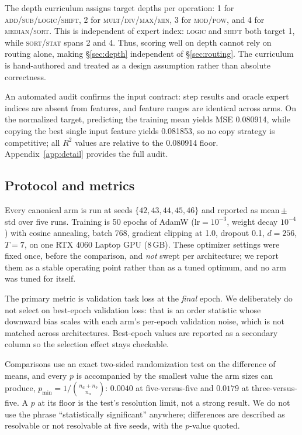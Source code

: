 \documentclass{article}
\begin{document}
The depth curriculum assigns target depths per operation: 1 for \textsc{add}/\textsc{sub}/\textsc{logic}/\textsc{shift}, 2 for \textsc{mult}/\textsc{div}/\textsc{max}/\textsc{min}, 3 for \textsc{mod}/\textsc{pow}, and 4 for \textsc{median}/\textsc{sort}. This is independent of expert index: \textsc{logic} and \textsc{shift} both target 1, while \textsc{sort/stat} spans 2 and 4. Thus, scoring well on depth cannot rely on routing alone, making \S\ref{sec:depth} independent of \S\ref{sec:routing}. The curriculum is hand-authored and treated as a design assumption rather than absolute correctness.

An automated audit confirms the input contract: step results and oracle expert indices are absent from features, and feature ranges are identical across arms. On the normalized target, predicting the training mean yields MSE 0.080914, while copying the best single input feature yields 0.081853, so no copy strategy is competitive; all $R^2$ values are relative to the 0.080914 floor. Appendix~\ref{app:detail} provides the full audit.

\subsection{Protocol and metrics}\label{sec:protocol}
\label{sec:protocol}

Every canonical arm is run at seeds $\{42,43,44,45,46\}$ and reported as
mean\,$\pm$\,std over five runs. Training is 50 epochs of AdamW
($\text{lr}=10^{-3}$, weight decay $10^{-4}$) with cosine annealing, batch
768, gradient clipping at 1.0, dropout 0.1, $d = 256$, $T = 7$, on one RTX
4060 Laptop GPU (8\,GB). These optimizer settings were fixed once, before the
comparison, and \emph{not} swept per architecture; we report them as a stable
operating point rather than as a tuned optimum, and no arm was tuned for
itself.

The primary metric is validation task loss at the \emph{final} epoch. We
deliberately do not select on best-epoch validation loss: that is an order
statistic whose downward bias scales with each arm's per-epoch validation
noise, which is not matched across architectures. Best-epoch values are
reported as a secondary column so the selection effect stays checkable.

Comparisons use an exact two-sided randomization test on the difference of
means, and every $p$ is accompanied by the smallest value the arm sizes can
produce, $p_{\min} = 1/\binom{n_a+n_b}{n_a}$: $0.0040$ at five-versus-five and
$0.0179$ at three-versus-five. A $p$ at its floor is the test's resolution
limit, not a strong result. We do not use the phrase ``statistically
significant'' anywhere; differences are described as resolvable or not
resolvable at five seeds, with the $p$-value quoted.
\end{document}
